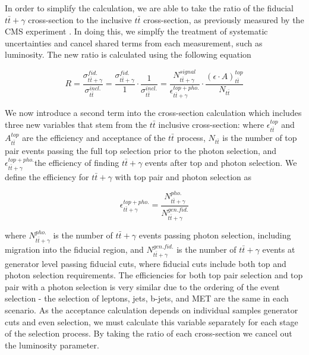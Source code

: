 In order to simplify the calculation, we are able to take the ratio of the fiducial $t\bar{t}+\gamma$ cross-section to the inclusive $t\bar{t}$ cross-section, as previously measured by the CMS experiment \cite{ttbarXsectiondilepton}. In doing this, we simplfy the treatment of systematic uncertainties and cancel shared terms from each measurement, such as luminosity. The new ratio is calculated using the following equation

\begin{equation}
R = \frac{\sigma_{t\bar{t}+\gamma}^{fid.}}{\sigma_{t\bar{t}}^{incl.}} = \frac{\sigma_{t\bar{t}+\gamma}^{fid.}}{1}\cdot\frac{1}{\sigma_{t\bar{t}}^{incl.}} = \frac{N_{t\bar{t}+\gamma}^{signal}}{\epsilon_{t\bar{t}+\gamma}^{top+pho.}} \cdot \frac{(\epsilon \cdot A)_{t\bar{t}}^{top}}{N_{t\bar{t}}}
\end{equation}

We now introduce a second term into the cross-section calculation which includes three new variables that stem from the $t\bar{t}$ inclusive cross-section: where $\epsilon_{t\bar{t}}^{top}$ and $A_{t\bar{t}}^{top}$ are the efficiency and acceptance of the $t\bar{t}$ process, $N_{t\bar{t}}$ is the number of top pair events passing the full top selection prior to the photon selection, and $\epsilon_{t\bar{t}+\gamma}^{top+pho.}$the efficiency of finding $t\bar{t}+\gamma$ events after top and photon selection. We define the efficiency for $t\bar{t}+\gamma$ with top pair and photon selection as

\begin{equation}
\epsilon_{t\bar{t}+\gamma}^{top+pho.} = \frac{N_{t\bar{t}+\gamma}^{pho.}}{N_{t\bar{t}+\gamma}^{gen. fid.}}
\end{equation}


where $N_{t\bar{t}+\gamma}^{pho.}$ is the number of $t\bar{t}+\gamma$ events passing photon selection, including migration into the fiducial region, and $N_{t\bar{t}+\gamma}^{gen. fid.}$ is the number of $t\bar{t}+\gamma$ events at generator level passing fiducial cuts, where fiducial cuts include both top and photon selection requirements. The efficiencies for both top pair selection and top pair with a photon selection is very similar due to the ordering of the event selection - the selection of leptons, jets, b-jets, and MET are the same in each scenario. As the acceptance calculation depends on individual samples generator cuts and even selection, we must calculate this variable separately for each stage of the selection process. By taking the ratio of each cross-section we cancel out the luminosity parameter.

